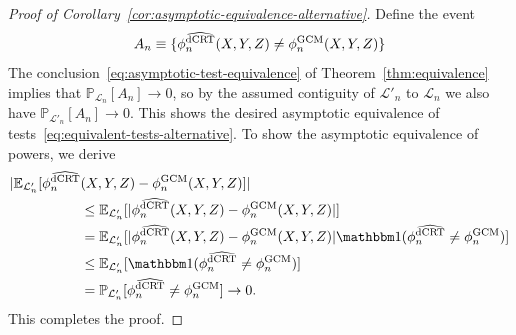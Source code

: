 \documentclass[aos]{imsart}
\theoremstyle{definition}
\theoremstyle{remark}
\newcommand{\E}{\mathbb E}								%
\renewcommand{\P}{\mathbb{P}}							%
\newcommand{\indicator}{\mathbbm 1}						%
\newcommand{\srx}{X}									%
\newcommand{\srz}{Z}									%
\newcommand{\sry}{Y}									%
\newcommand{\law}{\mathcal L}							%
\newcommand{\GCM}{\textnormal{GCM}}						%
\newcommand{\dCRThat}{\widehat{\textnormal{dCRT}}}		%
\begin{document}
\begin{proof}[Proof of Corollary~\ref{cor:asymptotic-equivalence-alternative}]
Define the event
$$
A_n \equiv \{\phi^{\dCRThat}_{n}(\srx, \sry, \srz) \neq \phi^{\GCM}_{n}(\srx, \sry, \srz)\}
$$
The conclusion~\eqref{eq:asymptotic-test-equivalence} of Theorem~\ref{thm:equivalence} implies that $\P_{\law_n}[A_n] \to 0$, so by the assumed contiguity of $\law'_n$ to $\law_n$ we also have $\P_{\law'_n}[A_n] \to 0$. This shows the desired asymptotic equivalence of tests~\eqref{eq:equivalent-tests-alternative}. To show the asymptotic equivalence of powers, we derive
\begin{align*}
|\E_{\law'_n}[\phi_n^{\dCRThat}&(\srx, \sry, \srz)-\phi_n^{\GCM}(\srx, \sry, \srz)]|
\\ &\leq
\E_{\law'_n}[|\phi_n^{\dCRThat}(\srx, \sry, \srz)-\phi_n^{\GCM}(\srx, \sry, \srz)|]\\
&= \E_{\law'_n}[|\phi_n^{\dCRThat}(\srx, \sry, \srz)-\phi_n^{\GCM}(\srx, \sry, \srz)|\indicator(\phi_n^{\dCRThat} \neq \phi_n^{\GCM})]\\
&\leq\E_{\law'_n}[\indicator(\phi_n^{\dCRThat} \neq \phi_n^{\GCM})]\\
&=\P_{\law'_n}[\phi_n^{\dCRThat} \neq \phi_n^{\GCM}] \to 0.
\end{align*}
This completes the proof.
\end{proof}
\end{document}
